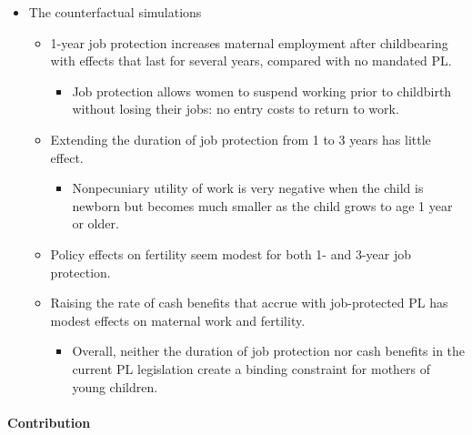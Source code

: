 \documentclass[../root]{subfiles}
\begin{document}
    \begin{itemize}
      \item The counterfactual simulations
      \begin{itemize}
        \item 1-year job protection increases maternal employment after childbearing with effects that last for several years, compared with no mandated PL.
        \begin{itemize}
          \item Job protection allows women to suspend working prior to childbirth without losing their jobs: no entry costs to return to work.
        \end{itemize}
        \item Extending the duration of job protection from 1 to 3 years has little effect.
        \begin{itemize}
          \item Nonpecuniary utility of work is very negative when the child is newborn but becomes much smaller as the child grows to age 1 year or older.
        \end{itemize}
        \item Policy effects on fertility seem modest for both 1- and 3-year job protection.
        \item Raising the rate of cash benefits that accrue with job-protected PL has modest effects on maternal work and fertility.
        \begin{itemize}
          \item Overall, neither the duration of job protection nor cash benefits in the current PL legislation create a binding constraint for mothers of young children.
        \end{itemize}
      \end{itemize}
    \end{itemize}


    \paragraph{Contribution}
\end{document}
